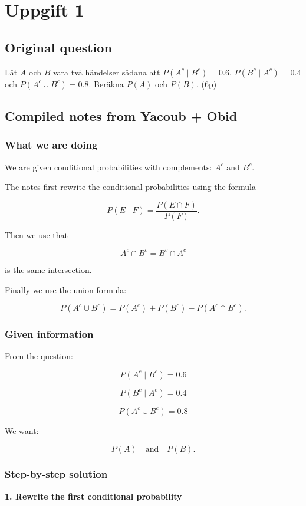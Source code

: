 \documentclass[10pt]{article}
\begin{document}
\section*{Uppgift 1}

\subsection*{Original question}
Låt $A$ och $B$ vara två händelser sådana att
$P(A^c\mid B^c)=0.6$, $P(B^c\mid A^c)=0.4$ och
$P(A^c\cup B^c)=0.8$.
Beräkna $P(A)$ och $P(B)$.
\hfill (6p)

\subsection*{Compiled notes from Yacoub + Obid}

\subsubsection*{What we are doing}
We are given conditional probabilities with complements:
$A^c$ and $B^c$.

The notes first rewrite the conditional probabilities using
the formula

\[
P(E\mid F)
=\frac{P(E\cap F)}{P(F)}.
\]

Then we use that

\[
A^c\cap B^c
=
B^c\cap A^c
\]

is the same intersection.

Finally we use the union formula:

\[
P(A^c\cup B^c)
=
P(A^c)+P(B^c)-P(A^c\cap B^c).
\]

\subsubsection*{Given information}
From the question:

\[
P(A^c\mid B^c)=0.6
\]

\[
P(B^c\mid A^c)=0.4
\]

\[
P(A^c\cup B^c)=0.8
\]

We want:

\[
P(A)\quad \text{and}\quad P(B).
\]

\subsubsection*{Step-by-step solution}

\textbf{1. Rewrite the first conditional probability}
\end{document}
